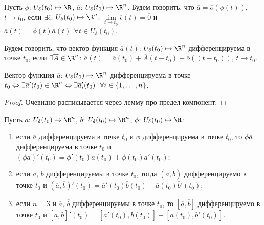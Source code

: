\begin{definition}
    Пусть $\phi$: $U_{\delta} (t_0) \mapsto \R$, $\overline{a}$: $U_{\delta} (t_0) \mapsto \R^n$. Будем говорить, что $\overline{a} = \overline{o}(\phi(t))$, $t\to t_{0}$, если $\exists \overline{\epsilon}$: $U_{\delta} (t_{0}) \mapsto \R^n$: $\lim\limits_{t\to t_{0}} \overline{\epsilon} (t) = \overline{0}$ и $\overline{a} (t) = \phi (t) \overline{a} (t) \ \ \forall t \in U_{\delta} (t_0)$.
\end{definition}
\begin{definition}
    Будем говорить, что вектор-функция $\overline{a} (t)$: $U_{\delta} (t_{0}) \mapsto \R^n$ дифференцируема в точке $t_{0}$, если $\exists \overline{A} \in \R^n$: $\overline{a} (t) = \overline{a} (t_{0}) + \overline{A} (t - t_{0}) + \overline{o} ((t - t_{0}))$, $t\to t_{0}$.
\end{definition}
\begin{theorem}
    Вектор функция $\overline{a}$: $U_{\delta} (t_{0}) \mapsto \R^n$ дифференцируема в точке $t_{0} \Leftrightarrow \exists \overline{a}' (t_{0}) \in \R^n \Leftrightarrow \exists \overline{a}_{i}' (t_{0}) \ \ \forall i \in \{1, \ldots, n\}$.
\end{theorem}
\begin{proof}
    Очевидно расписывается через лемму про предел компонент.
\end{proof}
\begin{theorem}
    Пусть $\overline{a}$: $U_{\delta} (t_{0}) \mapsto \R^n$, $\overline{b}$: $U_{\delta} (t_{0}) \mapsto \R^n$, $\phi$: $U_{\delta} (t_{0}) \mapsto \R$:
    \begin{enumerate}
        \item если $\overline{a}$ дифференцируема в точке $t_{0}$ и $\phi$ дифференцируема в точке $t_{0}$, то $\phi \overline{a}$ дифференцируема в точке $t_{0}$ и $(\phi \overline{a})' (t_{0}) = \phi' (t_{0}) \overline{a} (t_{0}) + \phi (t_{0}) \overline{a}' (t_{0})$;
        \item если $\overline{a}$, $\overline{b}$ дифференцируемы в точке $t_{0}$, тогда $(\overline{a}, \overline{b})$ дифференцируемо в точке $t_{0}$ и $(\overline{a}, \overline{b})' (t_{0}) = \overline{a}' (t_{0}) \overline{b} (t_{0}) + \overline{a} (t_{0}) \overline{b}' (t_{0})$;
        \item если $n = 3$ и $\overline{a}$, $\overline{b}$ дифференцируемы в точке $t_{0}$, то $[\overline{a}, \overline{b}]$ дифференцируемо в точке $t_{0}$ и $[\overline{a}, \overline{b}]' (t_{0}) = [\overline{a}' (t_{0}), \overline{b} (t_{0})] + [\overline{a} (t_{0}), \overline{b}' (t_{0})]$.
    \end{enumerate}
\end{theorem}

